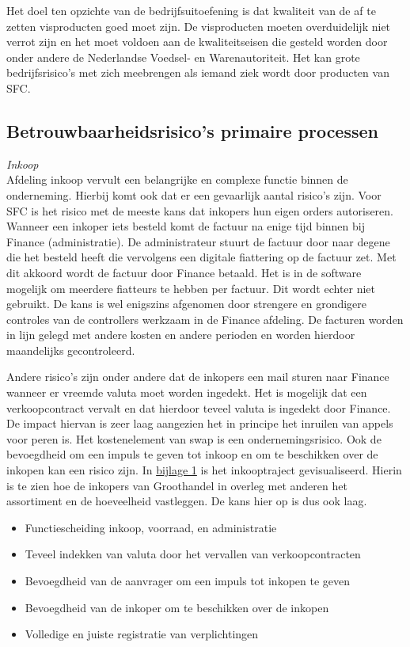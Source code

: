 Het doel ten opzichte van de bedrijfsuitoefening is dat kwaliteit van de af te zetten visproducten goed moet zijn. De visproducten moeten overduidelijk niet verrot zijn en het moet voldoen aan de kwaliteitseisen die gesteld worden door onder andere de Nederlandse Voedsel- en Warenautoriteit. Het kan grote bedrijfsrisico's met zich meebrengen als iemand ziek wordt door producten van SFC.


\subsection{Betrouwbaarheidsrisico's primaire processen}
\textit{Inkoop} \\
Afdeling inkoop vervult een belangrijke en complexe functie binnen de onderneming. Hierbij komt ook dat er een gevaarlijk aantal risico's zijn. Voor SFC is het risico met de meeste kans dat inkopers hun eigen orders autoriseren. Wanneer een inkoper iets besteld komt de factuur na enige tijd binnen bij Finance (administratie). De administrateur stuurt de factuur door naar degene die het besteld heeft die vervolgens een digitale fiattering op de factuur zet. Met dit akkoord wordt de factuur door Finance betaald. Het is in de software mogelijk om meerdere fiatteurs te hebben per factuur. Dit wordt echter niet gebruikt. De kans is wel enigszins afgenomen door strengere en grondigere controles van de controllers werkzaam in de Finance afdeling. De facturen worden in lijn gelegd met andere kosten en andere perioden en worden hierdoor maandelijks gecontroleerd. 

Andere risico's zijn onder andere dat de inkopers een mail sturen naar Finance wanneer er vreemde valuta moet worden ingedekt. Het is mogelijk dat een verkoopcontract vervalt en dat hierdoor teveel valuta is ingedekt door Finance. De impact hiervan is zeer laag aangezien het in principe het inruilen van appels voor peren is. Het kostenelement van swap is een ondernemingsrisico. Ook de bevoegdheid om een impuls te geven tot inkoop en om te beschikken over de inkopen kan een risico zijn. In \hyperlink{bij:treasury}{bijlage 1} is het inkooptraject gevisualiseerd. Hierin is te zien hoe de inkopers van Groothandel in overleg met anderen het assortiment en de hoeveelheid vastleggen. De kans hier op is dus ook laag.

\begin{itemize}
    \item Functiescheiding inkoop, voorraad, en administratie
    \item Teveel indekken van valuta door het vervallen van verkoopcontracten
    \item Bevoegdheid van de aanvrager om een impuls tot inkopen te geven
    \item Bevoegdheid van de inkoper om te beschikken over de inkopen
    \item Volledige en juiste registratie van verplichtingen
\end{itemize}





